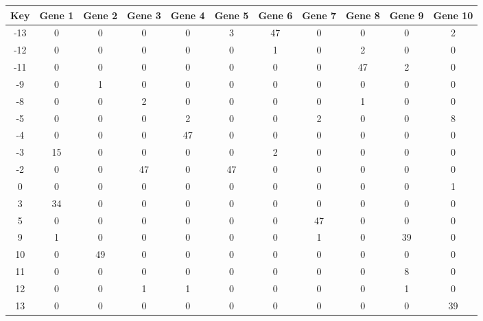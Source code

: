 \begin{tabular}{|c|c|c|c|c|c|c|c|c|c|c|}
\hline
Key & Gene 1 & Gene 2 & Gene 3 & Gene 4 & Gene 5 & Gene 6 & Gene 7 & Gene 8 & Gene 9 & Gene 10 \\
\hline
-13 & 0 & 0 & 0 & 0 & 3 & 47 & 0 & 0 & 0 & 2 \\
-12 & 0 & 0 & 0 & 0 & 0 & 1 & 0 & 2 & 0 & 0 \\
-11 & 0 & 0 & 0 & 0 & 0 & 0 & 0 & 47 & 2 & 0 \\
-9 & 0 & 1 & 0 & 0 & 0 & 0 & 0 & 0 & 0 & 0 \\
-8 & 0 & 0 & 2 & 0 & 0 & 0 & 0 & 1 & 0 & 0 \\
-5 & 0 & 0 & 0 & 2 & 0 & 0 & 2 & 0 & 0 & 8 \\
-4 & 0 & 0 & 0 & 47 & 0 & 0 & 0 & 0 & 0 & 0 \\
-3 & 15 & 0 & 0 & 0 & 0 & 2 & 0 & 0 & 0 & 0 \\
-2 & 0 & 0 & 47 & 0 & 47 & 0 & 0 & 0 & 0 & 0 \\
0 & 0 & 0 & 0 & 0 & 0 & 0 & 0 & 0 & 0 & 1 \\
3 & 34 & 0 & 0 & 0 & 0 & 0 & 0 & 0 & 0 & 0 \\
5 & 0 & 0 & 0 & 0 & 0 & 0 & 47 & 0 & 0 & 0 \\
9 & 1 & 0 & 0 & 0 & 0 & 0 & 1 & 0 & 39 & 0 \\
10 & 0 & 49 & 0 & 0 & 0 & 0 & 0 & 0 & 0 & 0 \\
11 & 0 & 0 & 0 & 0 & 0 & 0 & 0 & 0 & 8 & 0 \\
12 & 0 & 0 & 1 & 1 & 0 & 0 & 0 & 0 & 1 & 0 \\
13 & 0 & 0 & 0 & 0 & 0 & 0 & 0 & 0 & 0 & 39 \\
\hline
\end{tabular}